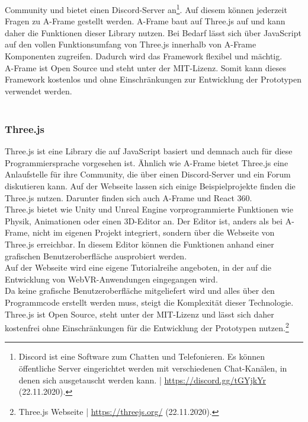 \documentclass[a4paper,12pt,oneside]{article}
\begin{document}
        Community und bietet einen Discord-Server an\footnote{Discord ist eine Software zum Chatten und Telefonieren. Es können öffentliche Server eingerichtet werden mit verschiedenen Chat-Kanälen, in denen sich ausgetauscht werden kann. | \url{https://discord.gg/tGYjkYr} (22.11.2020).}.
        Auf diesem können jederzeit Fragen zu A-Frame gestellt werden.
        A-Frame baut auf Three.js auf und kann daher die Funktionen
        dieser Library nutzen. Bei Bedarf lässt sich über JavaScript auf 
        den vollen Funktionsumfang von Three.js innerhalb von A-Frame Komponenten
        zugreifen. Dadurch wird das Framework flexibel und mächtig. \\
        A-Frame ist Open Source und steht unter der MIT-Lizenz. Somit kann dieses
        Framework kostenlos und ohne Einschränkungen zur Entwicklung der 
        Prototypen verwendet werden. \\ \\
      \subsubsection{Three.js}
        Three.js ist eine Library die auf JavaScript basiert und demnach auch
        für diese Programmiersprache vorgesehen ist. Ähnlich wie A-Frame bietet
        Three.js eine Anlaufstelle für ihre Community, die über einen Discord-Server
        und ein Forum diskutieren kann. Auf der Webseite lassen sich einige 
        Beispielprojekte finden die Three.js nutzen. Darunter finden sich auch
        A-Frame und React 360. \\
        Three.js bietet wie Unity und Unreal Engine vorprogrammierte Funktionen
        wie Physik, Animationen oder einen 3D-Editor an. Der Editor ist, anders
        als bei A-Frame, nicht im eigenen Projekt integriert, sondern über die
        Webseite von Three.js erreichbar. In diesem Editor können die
        Funktionen anhand einer grafischen Benutzeroberfläche ausprobiert werden. \\
        Auf der Webseite wird eine eigene Tutorialreihe angeboten, in der
        auf die Entwicklung von WebVR-Anwendungen eingegangen wird. \\
        Da keine grafische Benutzeroberfläche mitgeliefert wird und alles über den
        Programmcode erstellt werden muss, steigt die Komplexität dieser
        Technologie. \\
        Three.js ist Open Source, steht unter der MIT-Lizenz und lässt sich daher
        kostenfrei ohne Einschränkungen für die Entwicklung der Prototypen nutzen.\footnote{Three.js Webseite | \url{https://threejs.org/} (22.11.2020).}
\end{document}
